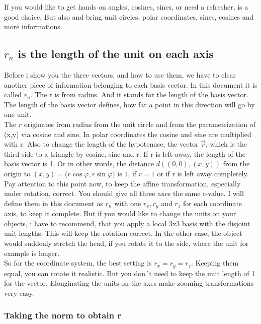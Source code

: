 \documentclass[a4paper]{article}
\begin{document}
If you would like to get hands on angles, cosines, sines, or need a refresher, \cite{Corral2} is a good choice. But also \cite{Corral1} and \cite{Strang2} bring unit circles, polar coordinates, sines, cosines and more informations.

\subsection{$r_n$ is the length of the unit on each axis}

Before i show you the three vectors, and how to use them, we have to clear another piece of information belonging to each
basis vector. In this document it is called $r_n$. The r is from radius. And it stands for the length of the basis vector.
The length of the basis vector defines, how far a point in this direction will go by one unit.\\

The $r$ originates from radius from the unit circle and from the parametrization of (x,y) via cosine and sine. 
In polar coordinates the cosine and sine are multiplied with r. Also to change the length of the hypotenuse, 
the vector $\vec{r}$, which is the third side to a triangle by cosine, sine and r. 
If r is left away, the length of the basis vector is 1. Or in other words, the distance $d((0,0),(x,y))$ from the origin to $(x,y)=($$r \cos \varphi$$, $$r \sin \varphi$$)$ is $1$, if $r=1$ or if r is left away completely.\\

Pay attention to this point now, to keep the affine transformation, especially under rotation, correct. You should give all three
axes the same r-value. I will define them in this document as $r_n$ with one $r_x, r_y$ and $r_z$ for each coordinate axis,
to keep it complete. But if you would like to change the units on your objects, i have to recommend, that you apply a local
3x3 basis with the disjoint unit lengths. This will keep the rotation correct. In the other case, the object would suddenly
stretch the head, if you rotate it to the side, where the unit for example is longer.\\

So for the coordinate system, the best setting is $r_x = r_y = r_z$. Keeping them equal, you can rotate it realistic. But you
don´t need to keep the unit length of 1 for the vector. Elonginating the units on the axes make zooming transformations very
easy.\\

\subsubsection{Taking the norm to obtain r}
\end{document}
